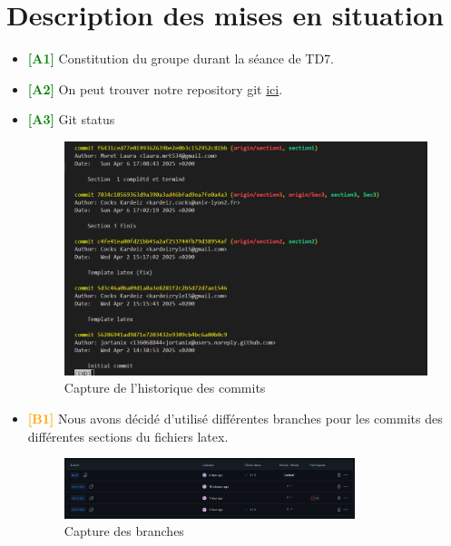 \section{Description des mises en situation}
\begin{itemize}
    \item \textbf{\textcolor{green}{[A1]}} Constitution du groupe durant la séance de TD7.
    \item \textbf{\textcolor{green}{[A2]}} On peut trouver notre repository git \href{https://github.com/jortanix/gestion_projet/branches}{ici}.
    
    \item \textbf{\textcolor{green}{[A3]}} Git status
    \begin{figure}[H]
        \centering
        \includegraphics[width=0.8\linewidth]{Images/A3.png}
        \caption{Capture de l'historique des commits}
        \label{fig:imageA3}
    \end{figure}
    
    \item \textbf{\textcolor{orange}{[B1]}} Nous avons décidé d'utilisé différentes branches pour les commits des différentes sections du fichiers latex.
    
    \begin{figure}[H]
    \centering
    \includegraphics[width=0.8\textwidth]{Images/B1.png}
    \caption{Capture des branches}
    \label{fig:imageB1}
    \end{figure}
    

\end{itemize}
